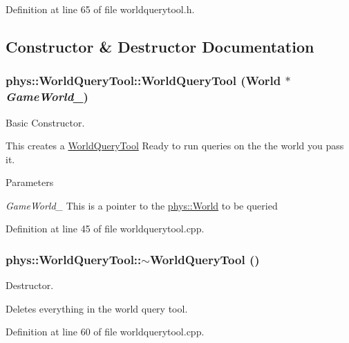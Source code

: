 Definition at line 65 of file worldquerytool.h.



\subsection{Constructor \& Destructor Documentation}
\hypertarget{classphys_1_1WorldQueryTool_a6b156ab7ea6236402c40467da7f11c0d}{
\subsubsection[{WorldQueryTool}]{\setlength{\rightskip}{0pt plus 5cm}phys::WorldQueryTool::WorldQueryTool ({\bf World} $\ast$ {\em GameWorld\_\-})}}
\label{d8/d69/classphys_1_1WorldQueryTool_a6b156ab7ea6236402c40467da7f11c0d}


Basic Constructor. 

This creates a \hyperlink{classphys_1_1WorldQueryTool}{WorldQueryTool} Ready to run queries on the the world you pass it. 
\begin{DoxyParams}{Parameters}
\item[{\em GameWorld\_\-}]This is a pointer to the \hyperlink{classphys_1_1World}{phys::World} to be queried \end{DoxyParams}


Definition at line 45 of file worldquerytool.cpp.

\hypertarget{classphys_1_1WorldQueryTool_ace36ffebcabbbf0553c517820bc636c9}{
\subsubsection[{$\sim$WorldQueryTool}]{\setlength{\rightskip}{0pt plus 5cm}phys::WorldQueryTool::$\sim$WorldQueryTool ()}}
\label{d8/d69/classphys_1_1WorldQueryTool_ace36ffebcabbbf0553c517820bc636c9}


Destructor. 

Deletes everything in the world query tool. 

Definition at line 60 of file worldquerytool.cpp.



